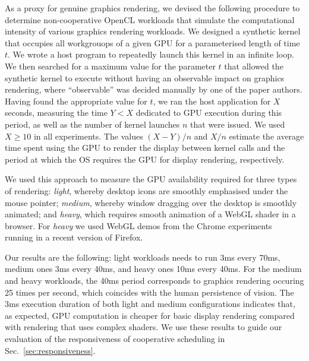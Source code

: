 \documentclass[numbers,nocopyrightspace,10pt]{sigplanconf}
\newcommand{\mysec}{Sec.~}
\begin{document}
As a proxy for genuine graphics rendering, we devised the following
procedure to determine non-cooperative OpenCL workloads that simulate
the computational intensity of various graphics rendering workloads.
%
We designed a synthetic kernel that occupies all workgrouops of a
given GPU for a parameterised length of time $t$.  We wrote a host
program to repeatedly launch this kernel in an infinite loop.  We then
searched for a maximum value for the parameter $t$ that allowed the
synthetic kernel to execute without having an observable impact on
graphics rendering, where ``observable'' was decided manually by one
of the paper authors.  Having found the appropriate value for $t$, we
ran the host application for $X$ seconds, measuring the time $Y < X$
dedicated to GPU execution during this period, as well as the number
of kernel launches $n$ that were issued.  We used $X \geq 10$ in all
experiments.  The values $(X-Y)/n$ and $X/n$ estimate the average time
spent using the GPU to render the display between kernel calls and the
period at which the OS requires the GPU for display rendering,
respectively.

We used this approach to measure the GPU availability required for three
types of rendering: \emph{light}, whereby desktop icons are smoothly
emphasised under the mouse pointer; \emph{medium}, whereby window
dragging over the desktop is smoothly animated; and \emph{heavy}, which
requires smooth animation of a WebGL shader in a browser.  For
\emph{heavy} we used WebGL demos from the Chrome
experiments~\cite{chrome-experiments} running
in a recent version of Firefox.



Our results are the following: light workloads needs to run 3ms every
70ms, medium ones 3ms every 40ms, and heavy ones 10ms every 40ms. For
the medium and heavy workloads, the 40ms period corresponds to graphics
rendering occuring 25 times per second, which coincides with the human
persistence of vision. The 3ms execution duration of both light and
medium configurations indicates that, as expected, GPU computation is
cheaper for basic display rendering compared with rendering that uses
complex shaders. We use these results to guide our evaluation of the
responsiveness of cooperative scheduling in
\mysec\ref{sec:responsiveness}.
\end{document}
